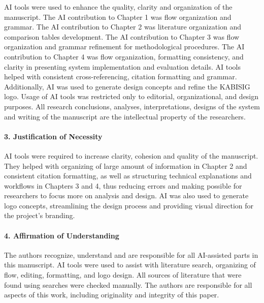 \hspace*{\parindent} AI tools were used to enhance the quality, clarity and organization of the manuscript. The AI contribution to Chapter 1 was flow organization and grammar. The AI contribution to Chapter 2 was literature organization and comparison tables development. The AI contribution to Chapter 3 was flow organization and grammar refinement for methodological procedures. The AI contribution to Chapter 4 was flow organization, formatting consistency, and clarity in presenting system implementation and evaluation details. AI tools helped with consistent cross-referencing, citation formatting and grammar. Additionally, AI was used to generate design concepts and refine the KABISIG logo. Usage of AI tools was restricted only to editorial, organizational, and design purposes. All research conclusions, analyses, interpretations, designs of the system and writing of the manuscript are the intellectual property of the researchers.\vspace{5mm}

\paragraph{3. Justification of Necessity}\hspace*{\parindent} 

\hspace*{\parindent} AI tools were required to increase clarity, cohesion and quality of the manuscript. They helped with organizing of large amount of information in Chapter 2 and consistent citation formatting, as well as structuring technical explanations and workflows in Chapters 3 and 4, thus reducing errors and making possible for researchers to focus more on analysis and design. AI was also used to generate logo concepts, streamlining the design process and providing visual direction for the project's branding.\vspace{5mm}

\paragraph{4. Affirmation of Understanding}\hspace*{\parindent} 

\hspace*{\parindent} The authors recognize, understand and are responsible for all AI-assisted parts in this manuscript. AI tools were used to assist with literature search, organizing of flow, editing, formatting, and logo design. All sources of literature that were found using searches were checked manually. The authors are responsible for all aspects of this work, including originality and integrity of this paper.